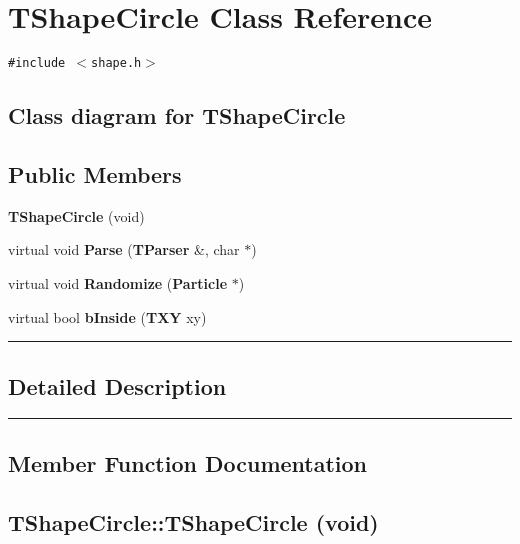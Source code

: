 \section{TShapeCircle  Class Reference}
\label{TShapeCircle}


{\tt \#include $<$shape.h$>$}

\subsection*{Class diagram for TShapeCircle}
\begin{figure}[H]
\begin{center}
\leavevmode
\setlength{\epsfysize}{2cm}
\end{center}
\end{figure}
\subsection*{Public Members}
\begin{CompactItemize}
\item 
{\bf TShape\-Circle} (void)
\item 
virtual void {\bf Parse} ({\bf TParser} \&, char $\ast$)
\item 
virtual void {\bf Randomize} ({\bf Particle} $\ast$)
\item 
virtual bool {\bf b\-Inside} ({\bf TXY} xy)
\end{CompactItemize}
\vspace{0.4cm}\hrule\vspace{0.2cm}
\subsection*{Detailed Description}
\vspace{0.4cm}\hrule\vspace{0.2cm}
\subsection*{Member Function Documentation}
\label{TShapeCircle_a0}
\subsection{\setlength{\rightskip}{0pt plus 5cm}TShape\-Circle::TShape\-Circle (void)}

